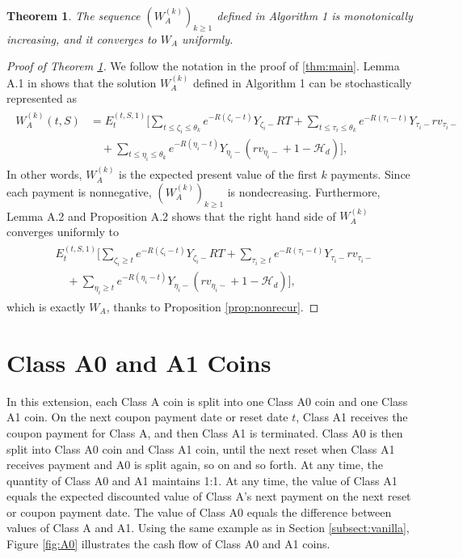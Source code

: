 \documentclass[draft, noinfoline]{ectaart}
\numberwithin{equation}{section}
\theoremstyle{plain}
\newtheorem{theorem}{Theorem}[section]
\begin{document}
\begin{appendices}
\begin{theorem}\label{thm:convergence}
	The sequence $(W_A^{(k)})_{k\ge 1}$ defined in Algorithm 1 is monotonically increasing, and it converges to $W_A$ uniformly.
\end{theorem}
\begin{proof}[Proof of Theorem \ref{thm:convergence}]
	We follow the notation in the proof of \ref{thm:main}. Lemma A.1 in \cite{dai_stochastic_2017} shows that the solution $W_A^{(k)}$ defined in Algorithm 1 can be stochastically represented as
	\begin{align*}
	\begin{split}
	W_A^{(k)}(t,S)&=E_t^{(t,S,1)}\Bigg[\sum_{t\le \zeta_i\le \theta_k}e^{-R(\zeta_i-t)}Y_{\zeta_i-}RT+\sum_{t\le \tau_i\le \theta_k}e^{-R(\tau_i-t)}Y_{\tau_i-}rv_{\tau_i-}\\
	&\quad+\sum_{t\le \eta_i\le \theta_k}e^{-R(\eta_i-t)}Y_{\eta_i-}(rv_{\eta_i-}+1-\mathcal{H}_d)\Bigg],
	\end{split}
	\end{align*}
	In other words, $W_A^{(k)}$ is the expected present value of the first $k$ payments. Since each payment is nonnegative, $(W_A^{(k)})_{k\ge 1}$ is nondecreasing. Furthermore, Lemma A.2 and Proposition A.2 shows that the right hand side of $W_A^{(k)}$ converges uniformly to
	\begin{align*}
	\begin{split}
	&E_t^{(t,S,1)}\Bigg[\sum_{\zeta_i\ge t}e^{-R(\zeta_i-t)}Y_{\zeta_i-}RT+\sum_{\tau_i\ge t}e^{-R(\tau_i-t)}Y_{\tau_i-}rv_{\tau_i-}\\
	&\quad+\sum_{\eta_i\ge t}e^{-R(\eta_i-t)}Y_{\eta_i-}(rv_{\eta_i-}+1-\mathcal{H}_d)\Bigg],
	\end{split}
	\end{align*}
	which is exactly $W_A$, thanks to Proposition \ref{prop:nonrecur}.
\end{proof}

\section{Class A0 and A1 Coins}

In this extension, each Class A coin is split into one Class A0 coin and one Class A1 coin. On the next coupon payment date or reset date $t$, Class A1 receives the coupon payment for Class A, and then Class A1 is terminated. Class A0 is then split into Class A0 coin and Class A1 coin, until the next reset when Class A1 receives payment and A0 is split again, so on and so forth. At any time, the quantity of Class A0 and A1 maintains 1:1. At any time, the value of Class A1 equals the expected discounted value of Class A's next payment on the next reset or coupon payment date. The value of Class A0 equals the difference between values of Class A and A1. Using the same example as in Section \ref{subsect:vanilla}, Figure \ref{fig:A0} illustrates the cash flow of Class A0 and A1 coins.


\end{appendices}
\end{document}
